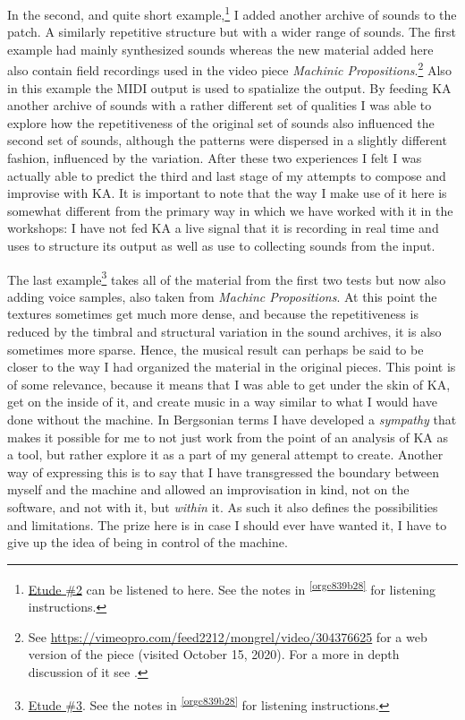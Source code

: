 \documentclass[11pt]{article}
\begin{document}
In the second, and quite short example,\footnote{\href{../../../uppdrag/GI/kimauto/final\_project/final\_stuff/KA\_example\_1.wav}{Etude \#2} can be listened to here. See the notes in \textsuperscript{\ref{orgc839b28}} for listening instructions.} I added another archive of sounds to the patch. A similarly repetitive structure but with a wider range of sounds. The first example had mainly synthesized sounds whereas the new material added here also contain field recordings used in the video piece \emph{Machinic Propositions}.\footnote{See \url{https://vimeopro.com/feed2212/mongrel/video/304376625} for a web version of the piece (visited October 15, 2020). For a more in depth discussion of it see \citet{frisk2017e,frisk_elberling_2019}.} Also in this example the MIDI output is used to spatialize the output. By feeding KA another archive of sounds with a rather different set of qualities I was able to explore how the repetitiveness of the original set of sounds also influenced the second set of sounds, although the patterns were dispersed in a slightly different fashion, influenced by the variation. After these two experiences I felt I was actually able to predict the third and last stage of my attempts to compose and improvise with KA. It is important to note that the way I make use of it here is somewhat different from the primary way in which we have worked with it in the workshops: I have not fed KA a live signal that it is recording in real time and uses to structure its output as well as use to collecting sounds from the input.

The last example\footnote{\href{../../../uppdrag/GI/kimauto/final\_project/final\_stuff/KA\_example\_3.wav}{Etude \#3}. See the notes in \textsuperscript{\ref{orgc839b28}} for listening instructions.} takes all of the material from the first two tests but now also adding voice samples, also taken from \emph{Machinc Propositions}. At this point the textures sometimes get much more dense, and because the repetitiveness is reduced by the timbral and structural variation in the sound archives, it is also sometimes more sparse. Hence, the musical result can perhaps be said to be closer to the way I had organized the material in the original pieces. This point is of some relevance, because it means that I was able to get under the skin of KA, get on the inside of it, and create music in a way similar to what I would have done without the machine. In Bergsonian terms I have developed a \emph{sympathy} that makes it possible for me to not just work from the point of an analysis of KA as a tool, but rather explore it as a part of my general attempt to create. Another way of expressing this is to say that I have transgressed the boundary between myself and the machine and allowed an improvisation in kind, not on the software, and not with it, but \emph{within} it. As such it also defines the possibilities and limitations. The prize here is in case I should ever have wanted it, I have to give up the idea of being in control of the machine.
\end{document}
